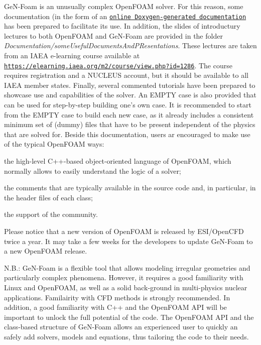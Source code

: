 Ge\+N-\/\+Foam is an unusually complex Open\+F\+O\+AM solver. For this reason, some documentation (in the form of an \href{https://foam-for-nuclear.gitlab.io/GeN-Foam/index.html}{\tt online Doxygen-\/generated documentation} has been prepared to facilitate its use. In addition, the slides of introductury lectures to both Open\+F\+O\+AM and Ge\+N-\/\+Foam are provided in the folder {\itshape Documentation/some\+Useful\+Documents\+And\+P\+Resentations}. These lectures are taken from an I\+A\+EA e-\/learning course available at \href{https://elearning.iaea.org/m2/course/view.php?id=1286}{\tt https\+://elearning.\+iaea.\+org/m2/course/view.\+php?id=1286}. The course requires registration and a N\+U\+C\+L\+E\+US account, but it should be available to all I\+A\+EA member states. Finally, several commented tutorials have been prepared to showcase use and capabilities of the solver. An E\+M\+P\+TY case is also provided that can be used for step-\/by-\/step building one’s own case. It is recommended to start from the E\+M\+P\+TY case to build each new case, as it already includes a consistent minimum set of (dummy) files that have to be present independent of the physics that are solved for. Beside this documentation, users ar encouraged to make use of the typical Open\+F\+O\+AM ways\+:
\begin{DoxyItemize}
\item the high-\/level C++-\/based object-\/oriented language of Open\+F\+O\+AM, which normally allows to easily understand the logic of a solver;
\item the comments that are typically available in the source code and, in particular, in the header files of each class;
\item the support of the community.
\end{DoxyItemize}

Please notice that a new version of Open\+F\+O\+AM is released by E\+S\+I/\+Open\+C\+FD twice a year. It may take a few weeks for the developers to update Ge\+N-\/\+Foam to a new Open\+F\+O\+AM release.

N.\+B.\+: Ge\+N-\/\+Foam is a flexible tool that allows modeling irregular geometries and particularly complex phenomena. However, it requires a good familiarity with Linux and Open\+F\+O\+AM, as well as a solid back-\/ground in multi-\/physics nuclear applications. Familairity with C\+FD methods is strongly recommended. In addition, a good familiarity with C++ and the Open\+F\+O\+AM A\+PI will be important to unlock the full potential of the code. The Open\+F\+O\+AM A\+PI and the class-\/based structure of Ge\+N-\/\+Foam allows an experienced user to quickly an safely add solvers, models and equations, thus tailoring the code to their needs.

